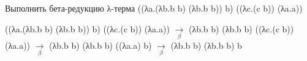 
\begin{problem}
Выполнить бета-редукцию λ-терма ((λa.(λb.b b) (λb.b b)) b) ((λc.(c b)) (λa.a))
\end{problem}
((λa.(λb.b b) (λb.b b)) b) ((λc.(c b)) (λa.a)) $\underset{\beta}{\longrightarrow}$ (λb.b b) (λb.b b) ((λc.(c b)) (λa.a)) $\underset{\beta}{\longrightarrow}$ 
(λb.b b) (λb.b b) ((λa.a) b) $\underset{\beta}{\longrightarrow}$ (λb.b b) (λb.b b) b 
